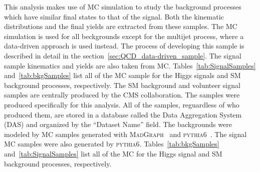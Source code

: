 This analysis makes use of MC simulation to study the background processes which have similar final states to that of the \HWWlvjj signal.
Both the kinematic distributions and the final yields are extracted from these samples.
The MC simulation is used for all beckgrounds except for the multijet process, where a data-driven approach is used instead.
The process of developing this sample is described in detail in the section~\ref{sec:QCD_data-driven_sample}.
The signal sample kinematics and yields are also taken from MC.
Tables~\ref{tab:SignalSamples} and~\ref{tab:bkgSamples} list all of the MC sample for the Higgs signals and SM background processes, respectively.
The SM background and volunteer signal samples are centrally produced by the CMS collaboration.
The \ggH samples were produced specifically for this analysis.
All of the samples, reguardless of who produced them, are stored in a database called the Data Aggregation System (DAS) and organized by the ``Dataset Name'' field.
The backgrounds were modeled by MC samples generated with \textsc{MadGraph}~\cite{Alwall:2014hca} and \textsc{pythia6}~\cite{1126-6708-2006-05-026}. 
The signal MC samples were also generated by \textsc{pythia6}.
Tables~\ref{tab:bkgSamples} and~\ref{tab:SignalSamples} list all of the MC for the Higgs signal and SM background processes, respectively.

